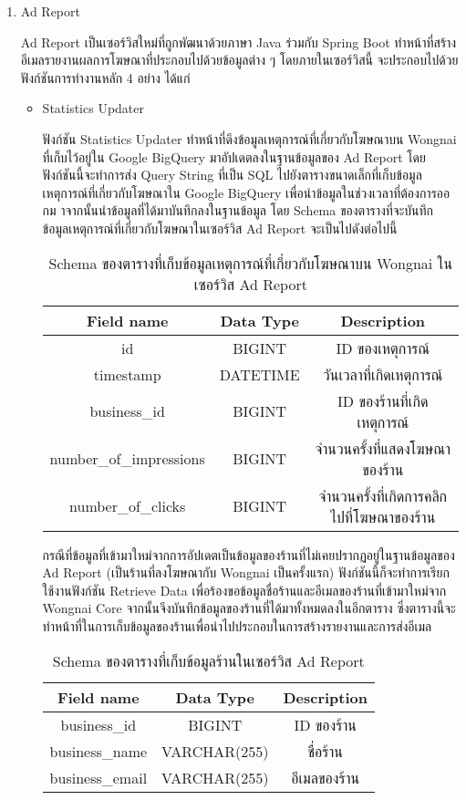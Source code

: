 \begin{enumerate}
	\item Ad Report
	
	Ad Report เป็นเซอร์วิสใหม่ที่ถูกพัฒนาด้วยภาษา Java ร่วมกับ Spring Boot ทำหน้าที่สร้างอีเมลรายงานผลการโฆษณาที่ประกอบไปด้วยข้อมูลต่าง ๆ โดยภายในเซอร์วิสนี้ จะประกอบไปด้วยฟังก์ชันการทำงานหลัก 4 อย่าง ได้แก่
	\begin{itemize}
		\item Statistics Updater
		
		ฟังก์ชัน Statistics Updater ทำหน้าที่ดึงข้อมูลเหตุการณ์ที่เกี่ยวกับโฆษณาบน Wongnai ที่เก็บไว้อยู่ใน Google BigQuery มาอัปเดตลงในฐานข้อมูลของ Ad Report โดยฟังก์ชันนี้จะทำการส่ง Query String ที่เป็น SQL ไปยังตารางขนาดเล็กที่เก็บข้อมูลเหตุการณ์ที่เกี่ยวกับโฆษณาใน Google BigQuery เพื่อนำข้อมูลในช่วงเวลาที่ต้องการออกม าจากนั้นนำข้อมูลที่ได้มาบันทึกลงในฐานข้อมูล โดย Schema ของตารางที่จะบันทึกข้อมูลเหตุการณ์ที่เกี่ยวกับโฆษณาในเซอร์วิส Ad Report จะเป็นไปดังต่อไปนี้
		
		\begin{table}[!h]
			\centering
			\begin{tabular}{|c|c|c|}
				\hline
				\textbf{Field name} & \textbf{Data Type} & \textbf{Description} \\ \hline
				id & BIGINT & ID ของเหตุการณ์ \\ \hline
				timestamp & DATETIME & วันเวลาที่เกิดเหตุการณ์ \\ \hline
				business\_id & BIGINT & ID ของร้านที่เกิดเหตุการณ์ \\ \hline
				number\_of\_impressions & BIGINT & จำนวนครั้งที่แสดงโฆษณาของร้าน \\ \hline
				number\_of\_clicks & BIGINT & จำนวนครั้งที่เกิดการคลิกไปที่โฆษณาของร้าน \\ \hline
			\end{tabular}
			\caption{Schema ของตารางที่เก็บข้อมูลเหตุการณ์ที่เกี่ยวกับโฆษณาบน Wongnai ในเซอร์วิส Ad Report}
			\label{Table:schema-ad-report-1}
		\end{table}
		
		กรณีที่ข้อมูลที่เข้ามาใหม่จากการอัปเดตเป็นข้อมูลของร้านที่ไม่เคยปรากฏอยู่ในฐานข้อมูลของ Ad Report (เป็นร้านที่ลงโฆษณากับ Wongnai เป็นครั้งแรก) ฟังก์ชันนี้ก็จะทำการเรียกใช้งานฟังก์ชัน Retrieve Data เพื่อร้องขอข้อมูลชื่อร้านและอีเมลของร้านที่เข้ามาใหม่จาก Wongnai Core จากนั้นจึงบันทึกข้อมูลของร้านที่ได้มาทั้งหมดลงในอีกตาราง ซึ่งตารางนี้จะทำหน้าที่ในการเก็บข้อมูลของร้านเพื่อนำไปประกอบในการสร้างรายงานและการส่งอีเมล 
		
		\begin{table}[!h]
			\centering
			\begin{tabular}{|c|c|c|}
				\hline
				\textbf{Field name} & \textbf{Data Type} & \textbf{Description} \\ \hline
				business\_id & BIGINT & ID ของร้าน \\ \hline
				business\_name & VARCHAR(255) & ชื่อร้าน \\ \hline
				business\_email & VARCHAR(255) & อีเมลของร้าน \\ \hline
			\end{tabular}
			\caption{Schema ของตารางที่เก็บข้อมูลร้านในเซอร์วิส Ad Report}
			\label{Table:schema-ad-report-2}
		\end{table}
		

\end{itemize}
\end{enumerate}
